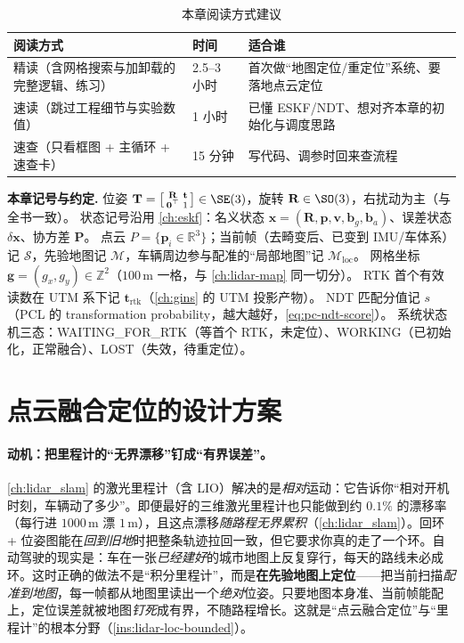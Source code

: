 \begin{table}[H]\centering\small
\caption{本章阅读方式建议}
\label{tab:lidar-loc-reading}
\begin{tabular}{lll}
\toprule
阅读方式 & 时间 & 适合谁 \\
\midrule
精读（含网格搜索与加卸载的完整逻辑、练习） & 2.5--3 小时 & 首次做“地图定位/重定位”系统、要落地点云定位 \\
速读（跳过工程细节与实验数值） & 1 小时 & 已懂 ESKF/NDT、想对齐本章的初始化与调度思路 \\
速查（只看框图 + 主循环 + 速查卡） & 15 分钟 & 写代码、调参时回来查流程 \\
\bottomrule
\end{tabular}
\end{table}

\begin{note}
\textbf{本章记号与约定.}\;
位姿 $\mathbf T=\big[\begin{smallmatrix}\mathbf R&\mathbf t\\\mathbf 0^\top&1\end{smallmatrix}\big]\in\SE(3)$，旋转 $\mathbf R\in\SO(3)$，右扰动为主（与全书一致）。
状态记号沿用 \cref{ch:eskf}：名义状态 $\mathbf x=(\mathbf R,\mathbf p,\mathbf v,\mathbf b_g,\mathbf b_a)$、误差状态 $\delta\mathbf x$、协方差 $\mathbf P$。
点云 $P=\{\mathbf p_i\in\mathbb R^3\}$；当前帧（去畸变后、已变到 IMU/车体系）记 $\mathcal S$，先验地图记 $\mathcal M$，车辆周边参与配准的“局部地图”记 $\mathcal M_{\mathrm{loc}}$。
网格坐标 $\mathbf g=(g_x,g_y)\in\mathbb Z^2$（$100$\,m 一格，与 \cref{ch:lidar-map} 同一切分）。
RTK 首个有效读数在 UTM 系下记 $\mathbf t_{\mathrm{rtk}}$（\cref{ch:gins} 的 UTM 投影产物）。
NDT 匹配分值记 $s$（PCL 的 transformation probability，越大越好，\cref{eq:pc-ndt-score}）。
系统状态机三态：\textsf{WAITING\_FOR\_RTK}（等首个 RTK，未定位）、\textsf{WORKING}（已初始化，正常融合）、\textsf{LOST}（失效，待重定位）。
\end{note}

\section{点云融合定位的设计方案}
\label{sec:lidar-loc-design}

\paragraph{动机：把里程计的“无界漂移”钉成“有界误差”。}
\cref{ch:lidar_slam} 的激光里程计（含 LIO）解决的是\emph{相对}运动：它告诉你“相对开机时刻，车辆动了多少”。即便最好的三维激光里程计也只能做到约 $0.1\%$ 的漂移率（每行进 $1000$\,m 漂 $1$\,m），且这点漂移\emph{随路程无界累积}（\cref{ch:lidar_slam}）。回环 + 位姿图能在\emph{回到旧地}时把整条轨迹拉回一致，但它要求你真的走了一个环。自动驾驶的现实是：车在一张\emph{已经建好}的城市地图上反复穿行，每天的路线未必成环。这时正确的做法不是“积分里程计”，而是\textbf{在先验地图上定位}——把当前扫描\emph{配准到地图}，每一帧都从地图里读出一个\emph{绝对}位姿。只要地图本身准、当前帧能配上，定位误差就被地图\emph{钉死}成有界，不随路程增长。这就是“点云融合定位”与“里程计”的根本分野（\cref{ins:lidar-loc-bounded}）。

